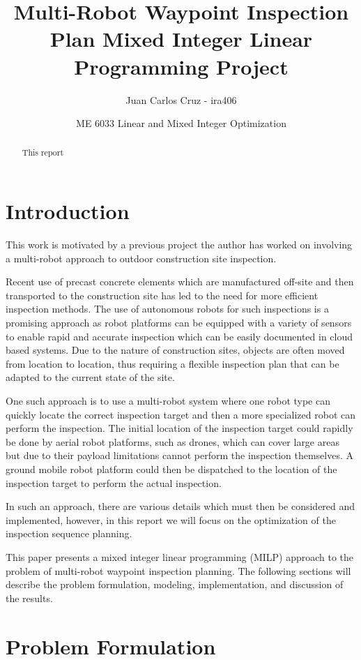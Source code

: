 \documentclass{article}
\title{Multi-Robot Waypoint Inspection Plan Mixed Integer Linear Programming Project}
\author{Juan Carlos Cruz - ira406}
\date{ME 6033 Linear and Mixed Integer Optimization}
\begin{document}
	\maketitle
	\noindent%

	\begin{abstract}
		This report
	\end{abstract}

	\section{Introduction}

		This work is motivated by a previous project the author has worked on involving a multi-robot approach to outdoor construction site inspection. 

		Recent use of precast concrete elements which are manufactured off-site and then transported to the construction site has led to the need for more efficient inspection methods. 
		The use of autonomous robots for such inspections is a promising approach as robot platforms can be equipped with a variety of sensors to enable rapid and accurate inspection which can be easily documented in cloud based systems.
		Due to the nature of construction sites, objects are often moved from location to location, thus requiring a flexible inspection plan that can be adapted to the current state of the site.

		One such approach is to use a multi-robot system where one robot type can quickly locate the correct inspection target and then a more specialized robot can perform the inspection.
		The initial location of the inspection target could rapidly be done by aerial robot platforms, such as drones, which can cover large areas but due to their payload limitations cannot perform the inspection themselves.
		A ground mobile robot platform could then be dispatched to the location of the inspection target to perform the actual inspection.

		In such an approach, there are various details which must then be considered and implemented, however, in this report we will focus on the optimization of the inspection sequence planning. 

		This paper presents a mixed integer linear programming (MILP) approach to the problem of multi-robot waypoint inspection planning.
		The following sections will describe the problem formulation, modeling, implementation, and discussion of the results.

	\section{Problem Formulation}
\end{document}
